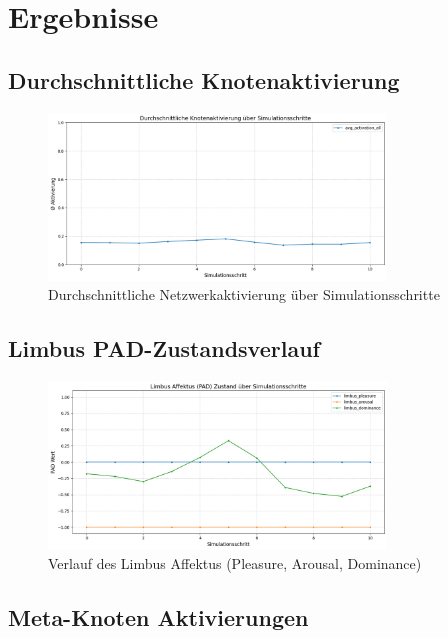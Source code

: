 \documentclass[11pt,a4paper]{article}
\begin{document}
\section{Ergebnisse}
\label{sec:results}

\subsection{Durchschnittliche Knotenaktivierung}

\begin{figure}[H]
    \centering
    \includegraphics[width=0.8\textwidth]{avg_activation_timeseries.png}
    \caption{Durchschnittliche Netzwerkaktivierung über Simulationsschritte}
    \label{fig:avg_activation}
\end{figure}

\subsection{Limbus PAD-Zustandsverlauf}

\begin{figure}[H]
    \centering
    \includegraphics[width=0.8\textwidth]{limbus_pad_timeseries.png}
    \caption{Verlauf des Limbus Affektus (Pleasure, Arousal, Dominance)}
    \label{fig:limbus_pad}
\end{figure}

\subsection{Meta-Knoten Aktivierungen}
\end{document}
